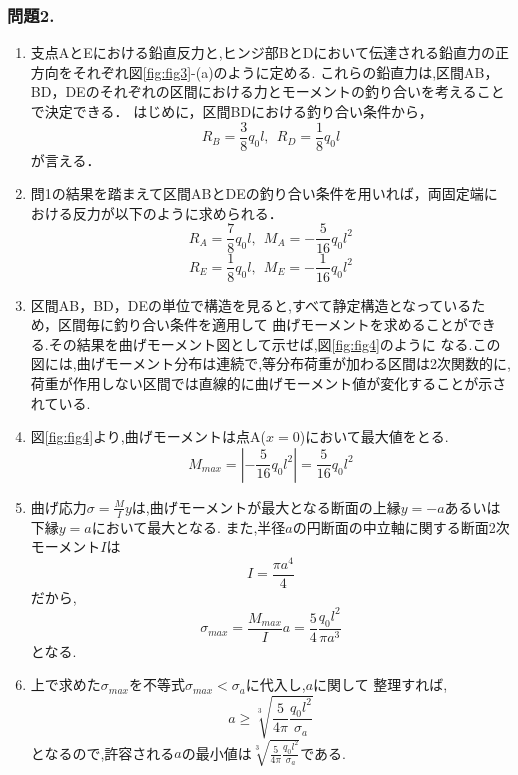 ﻿\documentclass[10pt,a4j]{jarticle}
\begin{document}
\subsubsection*{問題2.}
\begin{enumerate}
\item
支点AとEにおける鉛直反力と,ヒンジ部BとDにおいて伝達される鉛直力の正方向をそれぞれ図\ref{fig:fig3}-(a)のように定める.
これらの鉛直力は,区間AB，BD，DEのそれぞれの区間における力とモーメントの釣り合いを考えることで決定できる．
はじめに，区間BDにおける釣り合い条件から，
\begin{equation}
	R_B=\frac{3}{8}q_0l, \ \ R_D=\frac{1}{8}q_0l
\end{equation}
が言える．
\item
問1の結果を踏まえて区間ABとDEの釣り合い条件を用いれば，両固定端における反力が以下のように求められる．
\begin{equation}
	R_A=\frac{7}{8}q_0l, \ \ M_A=-\frac{5}{16}q_0l^2  
\end{equation}
\begin{equation}
	R_E=\frac{1}{8}q_0l, \ \ M_E=-\frac{1}{16}q_0l^2
\end{equation}
\item
区間AB，BD，DEの単位で構造を見ると,すべて静定構造となっているため，区間毎に釣り合い条件を適用して
曲げモーメントを求めることができる.その結果を曲げモーメント図として示せば,図\ref{fig:fig4}のように
なる.この図には,曲げモーメント分布は連続で,等分布荷重が加わる区間は2次関数的に,
荷重が作用しない区間では直線的に曲げモーメント値が変化することが示されている.
\item
図\ref{fig:fig4}より,曲げモーメントは点A($x=0$)において最大値をとる.
\begin{equation}
	M_{max}=\left|-\frac{5}{16}q_0l^2\right| = \frac{5}{16}q_0l^2
\end{equation}
\item
曲げ応力$\sigma=\frac{M}{I}y$は,曲げモーメントが最大となる断面の上縁$y=-a$あるいは下縁$y=a$において最大となる.
また,半径$a$の円断面の中立軸に関する断面2次モーメント$I$は
\begin{equation}
	I=\frac{\pi a^4}{4}	
\end{equation}
だから,
\begin{equation}
	\sigma_{max}=
	\frac{M_{max}}{I}a=
	\frac{5}{4} \frac{q_0l^2}{\pi a^3}
\end{equation}
となる.
\item
上で求めた$\sigma_{max}$を不等式$\sigma_{max}<\sigma_a$に代入し,$a$に関して
整理すれば,
\begin{equation}
	a \geq \sqrt[3]{\frac{5}{4\pi}\frac{q_0l^2}{\sigma_a}} 
\end{equation}
		となるので,許容される$a$の最小値は$\sqrt[3]{\frac{5}{4\pi}\frac{q_0l^2}{\sigma_a}}$である.
\end{enumerate}
\end{document}
